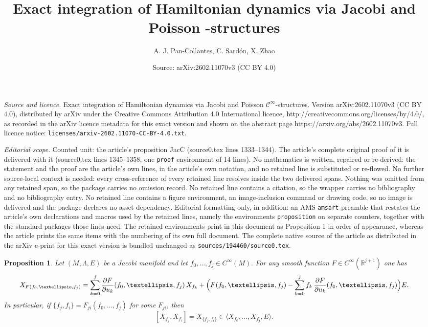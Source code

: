 \documentclass[10pt,a4paper]{amsart}
\title{Exact integration of Hamiltonian dynamics via Jacobi and Poisson \texorpdfstring{\cinf}{cinf}-structures}
\author{A. J. Pan-Collantes, C. Sard\'on, X. Zhao}
\date{Source: arXiv:2602.11070v3 (CC BY 4.0)}
\newcommand{\cinf}{$\mathcal{C}^{\infty}$}
\newtheorem{proposition}{Proposition}
\begin{document}
\maketitle

\noindent\emph{Source and licence.} Exact integration of Hamiltonian dynamics via Jacobi and Poisson \texorpdfstring{\cinf}{cinf}-structures. Version arXiv:2602.11070v3 (CC BY 4.0), distributed by arXiv under the Creative Commons Attribution 4.0 International licence, http://creativecommons.org/licenses/by/4.0/, as recorded in the arXiv licence metadata for this exact version and shown on the abstract page https://arxiv.org/abs/2602.11070v3. Full licence notice: \texttt{licenses/arxiv-2602.11070-CC-BY-4.0.txt}.\par\smallskip

\noindent\textit{Editorial scope.} Counted unit: the article's proposition JacC (source0.tex lines 1333--1344). The article's complete original proof of it is delivered with it (source0.tex lines 1345--1358, one \texttt{proof} environment of 14 lines). No mathematics is written, repaired or re-derived: the statement and the proof are the article's own lines, in the article's own notation, and no retained line is substituted or re-flowed.  No further source-local context is needed: every cross-reference of every retained line resolves inside the two delivered spans.  Nothing was omitted from any retained span, so the package carries no omission record.  No retained line contains a citation, so the wrapper carries no bibliography and no bibliography entry.  No retained line contains a figure environment, an image-inclusion command or drawing code, so no image is delivered and the package declares no asset dependency.  Editorial formatting only, in addition: an AMS \texttt{amsart} preamble that restates the article's own declarations and macros used by the retained lines, namely the environments \texttt{proposition} on separate counters, together with the standard packages those lines need.  The retained environments print in this document as Proposition 1 in order of appearance, whereas the article prints the same items with the numbering of its own full document.  The complete native source of the article as distributed in the arXiv e-print for this exact version is bundled unchanged as \texttt{sources/194460/source0.tex}.
\begin{proposition}\label{JacC}
Let $(M,\Lambda,E)$ be a Jacobi manifold and let $f_0,\dots,f_j\in C^\infty(M)$. For any smooth function $F\in C^\infty(\mathbb{R}^{j+1})$ one has
\[
X_{F(f_0,\dots,f_j)}
=\sum_{k=0}^j \frac{\partial F}{\partial u_k}(f_0,\dots,f_j)\,X_{f_k}
+\Bigl(F(f_0,\dots,f_j)-\sum_{k=0}^j f_k\,\frac{\partial F}{\partial u_k}(f_0,\dots,f_j)\Bigr)E.
\]
In particular, if $\{f_j,f_i\}=F_{ji}(f_0,\dots,f_j)$ for some $F_{ji}$, then
\[
[X_{f_j},X_{f_i}]=X_{\{f_j,f_i\}}\in \langle X_{f_0},\dots,X_{f_j},E\rangle.
\]
\end{proposition}
\end{document}
